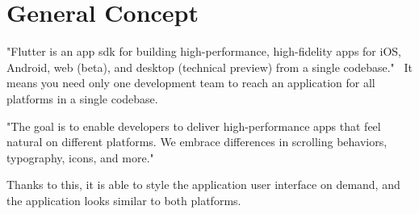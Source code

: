 \section{General Concept}\label{sec:general-concept}
"Flutter is an app \acrshort{sdk} for building high-performance, high-fidelity apps for iOS, Android, web (beta), and desktop (technical preview) from a single codebase."~\cite{flutterTechnicalOverview}
It means you need only one development team to reach an application for all platforms in a single codebase.

"The goal is to enable developers to deliver high-performance apps that feel natural on different platforms.
We embrace differences in scrolling behaviors, typography, icons, and more."~\cite{flutterTechnicalOverview}

Thanks to this, it is able to style the application user interface on demand, and the application looks similar to both platforms.
